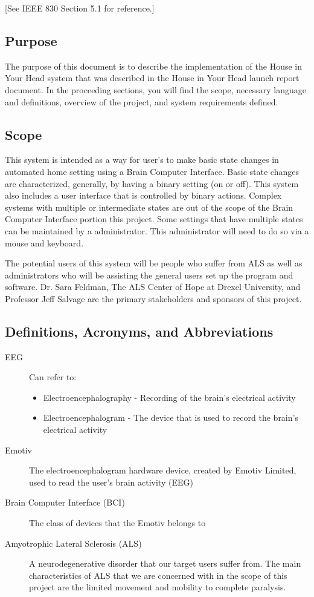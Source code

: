 \documentclass{article}
\begin{document}
[See IEEE 830 Section 5.1 for reference.]

\subsection{Purpose}
The purpose of this document is to describe the implementation of the House in Your Head system that 
was described in the House in Your Head launch report document. In the proceeding sections, you will 
find the scope, necessary language and definitions, overview of the project, and system requirements 
defined.

\subsection{Scope}

This system is intended as a way for user's to make basic state changes in automated home setting
using a Brain Computer Interface. Basic state changes are characterized, generally, by having a binary 
setting (on or off). This system also includes a user interface that is controlled by binary actions. Complex 
systems with multiple or intermediate states are out of the scope of the Brain Computer Interface portion 
this project. Some settings that have multiple states can be maintained by a administrator. This 
administrator will need to do so via a mouse and keyboard. 

The potential users of this system will be people who suffer from ALS as well as administrators 
who will be assisting the general users set up the program and software. Dr. Sara Feldman, The ALS 
Center of Hope at Drexel University, and Professor Jeff Salvage are the primary stakeholders and 
sponsors of this project.

\subsection{Definitions, Acronyms, and Abbreviations}
\begin{description}
    \item[EEG] Can refer to:
        \begin{itemize}
            \item Electroencephalography - Recording of the brain's electrical
                activity 
	        \item Electroencephalogram - The device that is used to record the
	            brain's electrical activity
        \end{itemize}
    \item[Emotiv] The electroencephalogram hardware device, created by Emotiv
        Limited, used to read the user's brain activity (EEG)
    \item[Brain Computer Interface (BCI)] The class of devices that the Emotiv
        belongs to
    \item[Amyotrophic Lateral Sclerosis (ALS)] A neurodegenerative disorder
        that our target users suffer from. The main characteristics of ALS
        that we are concerned with in the scope of this project are the
        limited movement and mobility to complete paralysis.
\end{description}
\end{document}
